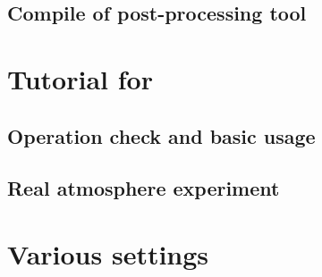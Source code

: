\documentclass[a4paper]{report}
\begin{document}
 \chapter{Compile of post-processing tool}
 


\part{Tutorial for \scalerm}
 \chapter{Operation check and basic usage} \label{chap:tutorial_ideal}
 
 
 
 


 \chapter{Real atmosphere experiment} \label{chap:tutorial_real}
 
 
 
 
 
 
 


% 
% 
% 


\part{Various settings} \label{part:basic_usel}
\end{document}
